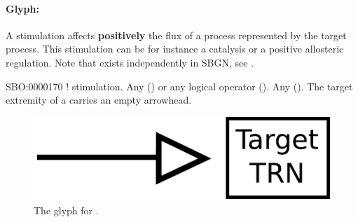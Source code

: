 
\paragraph{Glyph: }\label{sec:stimulation}

A stimulation affects \textbf{positively} the flux of a process represented by the target process. This stimulation can be for instance a catalysis or a positive allosteric regulation. Note that  exists independently in SBGN, see .

\begin{glyphDescription}
 \glyphSboTerm SBO:0000170 ! stimulation.
 \glyphOrigin Any  () or any logical operator ().
 \glyphTarget Any  ().
 \glyphEndPoint The target extremity of a  carries an empty arrowhead.
 \end{glyphDescription}

\begin{figure}[H]
  \centering
  \includegraphics[scale = 0.5]{images/stimulation}
  \caption{The \PD glyph for .}
  \label{fig:stimulation}
\end{figure}


